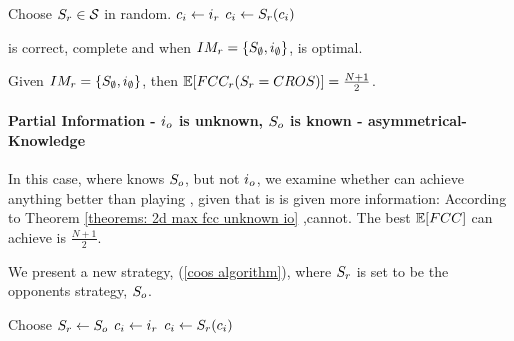 \documentclass[a4paper,english,10pt]{article}
\begin{document}
\begin{algorithm}
\begin{algorithmic}
	\STATE Choose $S_r \in \mathcal{S}$ in random.
    \STATE $c_i \leftarrow i_r$
    \LOOP
    	\STATE $c_i \leftarrow S_r(c_i)$
    \ENDLOOP
  
\end{algorithmic}
\caption{\cros\label{algorithms: cros}}
\end{algorithm}

\begin{theorem} \label{theorems: cros correctness and optimalty}
\cros is correct, complete and when $IM_r=\lbrace S_\emptyset, i_\emptyset \rbrace$, is optimal.
\end{theorem}

\begin{theorem} \label{cross efcc}
Given $IM_r=\lbrace S_\emptyset, i_\emptyset \rbrace$, then $\mathbb{E}[FCC_r(S_r=CROS)]=\frac{N+1}{2}$.
\end{theorem}


\paragraph{Partial Information - $i_o$ is unknown, $S_o$ is known - asymmetrical-Knowledge} 


In this case, where \rob knows $S_o$, but not $i_o$, we examine whether \rob can achieve anything better than playing \cros, given that is is given more information: According to Theorem \ref{theorems: 2d max fcc unknown io} ,\rob cannot. The best $\mathbb{E}[FCC]$ \rob can achieve is $\frac{N+1}{2}$.

We present a new strategy, \coos(\ref{coos algorithm}), where $S_r$ is set to be the opponents strategy, $S_o$. 
\begin{algorithm}
\begin{algorithmic}
	\STATE Choose $S_r \leftarrow S_o$
    \STATE $c_i \leftarrow i_r$
    \LOOP
    	\STATE $c_i \leftarrow S_r(c_i)$
    \ENDLOOP
  
\end{algorithmic}
\caption{\coos\label{coos algorithm}}
\end{algorithm}
\end{document}
